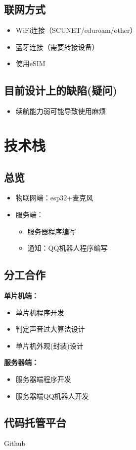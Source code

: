 \documentclass[12pt, a4paper, oneside]{ctexart}
\begin{document}
\subsection{联网方式}
\begin{itemize}
    \item WiFi连接（SCUNET/eduroam/other）
    \item 蓝牙连接（需要转接设备）
    \item 使用eSIM
\end{itemize}

\subsection{目前设计上的缺陷(疑问)}
\begin{itemize}
    \item 续航能力弱可能导致使用麻烦
\end{itemize}


\section{技术栈}
\subsection{总览}
\begin{itemize}
    \item 物联网端：esp32+麦克风
    \item 服务端：
    \begin{itemize}
        \item 服务器程序编写
        \item 通知：QQ机器人程序编写
    \end{itemize}

\end{itemize}

\subsection{分工合作}

\textbf{单片机端：}
\begin{itemize}
    
    \item 单片机程序开发
    \item 判定声音过大算法设计
    \item 单片机外观(封装)设计
\end{itemize}

\textbf{服务器端：}

\begin{itemize}
    \item 服务器端程序开发
    \item 服务器端QQ机器人开发
    
\end{itemize}

\subsection{代码托管平台} 
Github 
\end{document}
